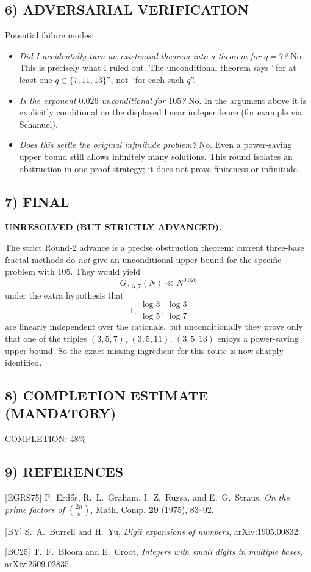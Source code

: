 \subsection*{6) ADVERSARIAL VERIFICATION}
Potential failure modes:
\begin{itemize}
\item \emph{Did I accidentally turn an existential theorem into a theorem for $q=7$?}  
No.  This is precisely what I ruled out.  The unconditional theorem says ``for at least one $q\in\{7,11,13\}$'', not ``for each such $q$''.

\item \emph{Is the exponent $0.026$ unconditional for $105$?}  
No.  In the argument above it is explicitly conditional on the displayed linear independence (for example via Schanuel).

\item \emph{Does this settle the original infinitude problem?}  
No.  Even a power-saving upper bound still allows infinitely many solutions.  This round isolates an obstruction in one proof strategy; it does not prove finiteness or infinitude.
\end{itemize}

\subsection*{7) FINAL}
\textbf{UNRESOLVED (BUT STRICTLY ADVANCED).}

The strict Round-2 advance is a precise obstruction theorem:
current three-base fractal methods do \emph{not} give an unconditional upper bound for the specific problem with $105$.
They would yield
\[
G_{3,5,7}(N)\ll N^{0.026}
\]
under the extra hypothesis that
\[
1,\ \frac{\log 3}{\log 5},\ \frac{\log 3}{\log 7}
\]
are linearly independent over the rationals, but unconditionally they prove only that one of the triples $(3,5,7)$, $(3,5,11)$, $(3,5,13)$ enjoys a power-saving upper bound.
So the exact missing ingredient for this route is now sharply identified.

\subsection*{8) COMPLETION ESTIMATE (MANDATORY)}
COMPLETION: 48\%

\subsection*{9) REFERENCES}
[EGRS75] P.~Erd\H{o}s, R.~L.~Graham, I.~Z.~Ruzsa, and E.~G.~Straus, \emph{On the prime factors of $\binom{2n}{n}$}, Math. Comp. \textbf{29} (1975), 83--92.

[BY] S.~A.~Burrell and H.~Yu, \emph{Digit expansions of numbers}, arXiv:1905.00832.

[BC25] T.~F.~Bloom and E.~Croot, \emph{Integers with small digits in multiple bases}, arXiv:2509.02835.

\bigskip

